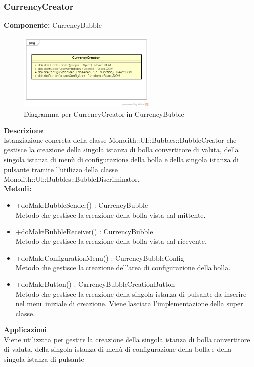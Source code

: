 \subsubsection{CurrencyCreator}
\textbf{Componente:}  CurrencyBubble\\
   \FloatBarrier
   \begin{figure}[ht]
   \centering
   \includegraphics[width=0.6\textwidth]{img/single-CurrencyCreator.png}
   \caption{{Diagramma per CurrencyCreator in CurrencyBubble}}
\end{figure}
\FloatBarrier
\textbf{Descrizione}\\
Istanziazione concreta della classe Monolith::UI::Bubbles::BubbleCreator che gestisce la creazione della singola istanza di bolla convertitore di valuta, della singola istanza di menù di configurazione della bolla e della singola istanza di pulsante tramite l'utilizzo della classe Monolith::UI::Bubbles::BubbleDiscriminator.
\\
\textbf{Metodi:} 
\begin{itemize}
\item +doMakeBubbleSender() : CurrencyBubble 
\\
Metodo che gestisce la creazione della bolla vista dal mittente.
\item +doMakeBubbleReceiver() : CurrencyBubble 
\\
Metodo che gestisce la creazione della bolla vista dal ricevente.
\item +doMakeConfigurationMenu() : CurrencyBubbleConfig 
\\
Metodo che gestisce la creazione dell'area di configurazione della bolla.
\item +doMakeButton() : CurrencyBubbleCreationButton 
\\
Metodo che gestisce la creazione della singola istanza di pulsante da inserire nel menu iniziale di creazione. Viene lasciata l'implementazione della super classe.
\end{itemize} 


\textbf{Applicazioni}\\
Viene utilizzata per gestire la creazione della singola istanza di bolla convertitore di valuta, della singola istanza di menù di configurazione della bolla e della singola istanza di pulsante. 


